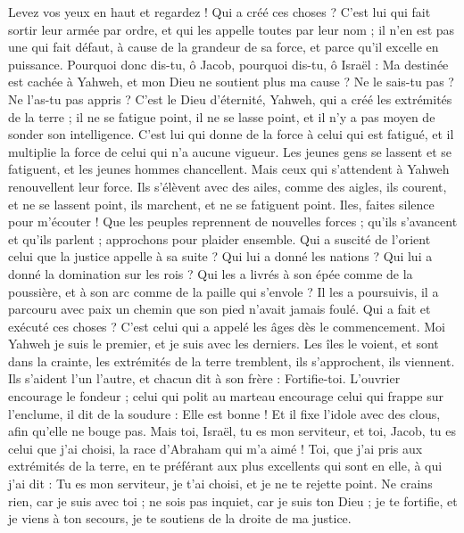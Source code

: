 \begin{multicols}{2}
Levez vos yeux en haut et regardez ! Qui a créé ces choses ? C'est lui qui fait sortir leur armée par ordre, et qui les appelle toutes par leur nom ; il n'en est pas une qui fait défaut, à cause de la grandeur de sa force, et parce qu'il excelle en puissance.
Pourquoi donc dis-tu, ô Jacob, pourquoi dis-tu, ô Israël : Ma destinée est cachée à Yahweh, et mon Dieu ne soutient plus ma cause ?
Ne le sais-tu pas ? Ne l'as-tu pas appris ? C'est le Dieu d'éternité, Yahweh, qui a créé les extrémités de la terre ; il ne se fatigue point, il ne se lasse point, et il n'y a pas moyen de sonder son intelligence.
C'est lui qui donne de la force à celui qui est fatigué, et il multiplie la force de celui qui n'a aucune vigueur.
Les jeunes gens se lassent et se fatiguent, et les jeunes hommes chancellent.
Mais ceux qui s'attendent à Yahweh renouvellent leur force. Ils s'élèvent avec des ailes, comme des aigles, ils courent, et ne se lassent point, ils marchent, et ne se fatiguent point.
\VerseOne{}Iles, faites silence pour m'écouter ! Que les peuples reprennent de nouvelles forces ; qu'ils s'avancent et qu'ils parlent ; approchons pour plaider ensemble.
Qui a suscité de l'orient celui que la justice appelle à sa suite ? Qui lui a donné les nations ? Qui lui a donné la domination sur les rois ? Qui les a livrés à son épée comme de la poussière, et à son arc comme de la paille qui s'envole ?
Il les a poursuivis, il a parcouru avec paix un chemin que son pied n'avait jamais foulé.
Qui a fait et exécuté ces choses ? C'est celui qui a appelé les âges dès le commencement. Moi Yahweh je suis le premier, et je suis avec les derniers.
Les îles le voient, et sont dans la crainte, les extrémités de la terre tremblent, ils s'approchent, ils viennent.
Ils s'aident l'un l'autre, et chacun dit à son frère : Fortifie-toi.
L'ouvrier encourage le fondeur ; celui qui polit au marteau encourage celui qui frappe sur l'enclume, il dit de la soudure : Elle est bonne ! Et il fixe l'idole avec des clous, afin qu'elle ne bouge pas.
Mais toi, Israël, tu es mon serviteur, et toi, Jacob, tu es celui que j'ai choisi, la race d'Abraham qui m'a aimé !
Toi, que j'ai pris aux extrémités de la terre, en te préférant aux plus excellents qui sont en elle, à qui j'ai dit : Tu es mon serviteur, je t'ai choisi, et je ne te rejette point.
Ne crains rien, car je suis avec toi ; ne sois pas inquiet, car je suis ton Dieu ; je te fortifie, et je viens à ton secours, je te soutiens de la droite de ma justice.

\end{multicols}
